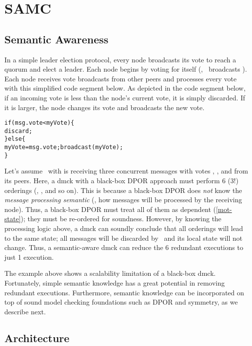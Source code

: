 \section{SAMC}
\label{sam-samc}

\subsection{Semantic Awareness}

In a simple leader election protocol, every node broadcasts its vote to reach a
quorum and elect a leader.  Each node begins by voting for itself (\eg, \ntwo\
broadcasts ).  Each node receives vote broadcasts from other peers
and processes every vote with this simplified code segment below.  As depicted
in the code segment below, if an incoming vote is less than the node's current
vote, it is simply discarded.  If it is larger, the node changes its vote and
broadcasts the new vote.

\begin{alltt}
if (msg.vote < myVote) \{
  discard;
\} else \{
  myVote = msg.vote; broadcast(myVote);
\}
\end{alltt}

Let's assume \nfour\ with  is receiving three concurrent messages
with votes \ts{1}, \ts{2}, and \ts{3} from its peers.  Here, a dmck with a
black-box DPOR approach must perform 6 (3!) orderings (\ts{123}, \ts{132}, and
so on).  This is because a black-box DPOR does {\em not} know the {\em message
processing semantic} (\ie, how messages will be processed by the receiving
node).  Thus, a black-box DPOR must treat all of them as dependent
(\sec\ref{mot-state}); they must be re-ordered for soundness.  However, by
knowing the processing logic above, a dmck can soundly conclude that all
orderings will lead to the same state; all messages will be discarded by \nfour\
and its local state will not change.  Thus, a semantic-aware dmck can reduce the
6 redundant executions to just 1 execution.

The example above shows a scalability limitation of a black-box dmck.
Fortunately, simple semantic knowledge has a great potential in removing
redundant executions.  Furthermore, semantic knowledge can be incorporated on
top of sound model checking foundations such as DPOR and symmetry, as we
describe next.

\subsection{Architecture}
\label{sam-arch}

